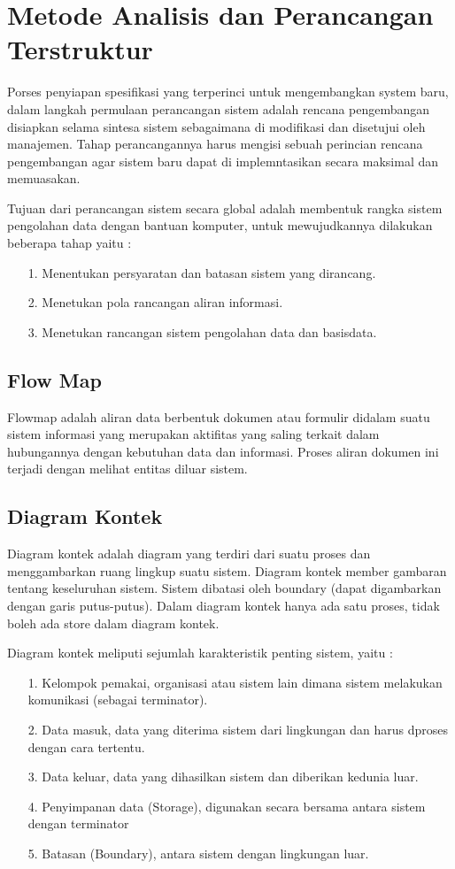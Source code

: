 \documentclass{jtetiproposalskripsi}
\begin{document}
\section{Metode Analisis dan Perancangan Terstruktur}
Porses penyiapan spesifikasi yang terperinci untuk mengembangkan system baru, dalam langkah permulaan perancangan sistem adalah rencana pengembangan disiapkan selama sintesa sistem sebagaimana di modifikasi dan disetujui oleh manajemen. Tahap perancangannya harus mengisi sebuah perincian rencana pengembangan agar sistem baru dapat di implemntasikan secara maksimal dan memuasakan.

Tujuan dari perancangan sistem secara global adalah membentuk rangka sistem pengolahan data dengan bantuan komputer, untuk mewujudkannya dilakukan beberapa tahap yaitu :
\begin{itemize}
\item[1.] Menentukan persyaratan dan batasan sistem yang dirancang.
\item[2.] Menetukan pola rancangan aliran informasi.
\item[3.] Menetukan rancangan sistem pengolahan data dan basisdata.
\end{itemize}

\subsection{Flow Map}
Flowmap adalah aliran data berbentuk dokumen atau formulir didalam suatu sistem informasi yang merupakan aktifitas yang saling terkait dalam hubungannya dengan kebutuhan data dan informasi. Proses aliran dokumen ini terjadi dengan melihat entitas diluar sistem.

\subsection{Diagram Kontek}
Diagram kontek adalah diagram yang terdiri dari suatu proses dan menggambarkan ruang lingkup suatu sistem. Diagram kontek member gambaran tentang keseluruhan sistem. Sistem dibatasi oleh boundary (dapat digambarkan dengan garis putus-putus). Dalam diagram kontek hanya ada satu proses, tidak boleh ada store dalam diagram kontek.

Diagram kontek meliputi sejumlah karakteristik penting sistem, yaitu : 

\begin{itemize}
\item[1.] Kelompok pemakai, organisasi atau sistem lain dimana sistem melakukan komunikasi (sebagai terminator).
\item[2.] Data masuk, data yang diterima sistem dari lingkungan dan harus dproses dengan cara tertentu.
\item[3.] Data keluar, data yang dihasilkan sistem dan diberikan kedunia luar.
\item[4.] Penyimpanan data (Storage), digunakan secara bersama antara sistem dengan terminator
\item[5.] Batasan (Boundary), antara sistem dengan lingkungan luar.
\end{itemize}
\end{document}
